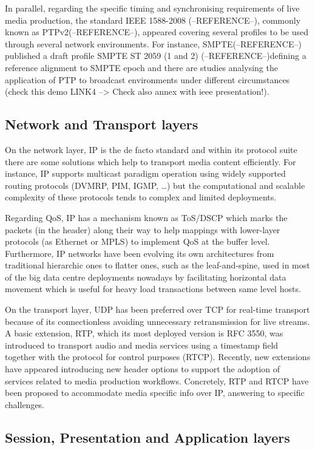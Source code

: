 In parallel, regarding the specific timing and synchronising requirements of live media production, the standard IEEE 1588-2008 (--REFERENCE--), commonly known as PTPv2(--REFERENCE--), appeared covering several profiles to be used through several network environments. For instance, SMPTE(--REFERENCE--) published a draft profile SMPTE ST 2059 (1 and 2) (--REFERENCE--)defining a reference alignment to SMPTE epoch and there are studies analysing the application of PTP to broadcast environments under different circumstances (check this demo LINK4 --> Check also annex with ieee presentation!).

\subsection{Network and Transport layers}

On the network layer, IP is the de facto standard and within its protocol suite there are some solutions which help to transport media content efficiently. For instance, IP supports multicast paradigm operation using widely supported routing protocols (DVMRP, PIM, IGMP, \ldots) but the
computational and scalable complexity of these protocols tends to complex and limited deployments.

Regarding QoS, IP has a mechanism known as ToS/DSCP which marks the packets (in the header) along their way to help mappings with lower-layer protocols (as Ethernet or MPLS) to implement QoS at the buffer level. Furthermore, IP networks have been evolving its own architectures from
traditional hierarchic ones to flatter ones, such as the leaf-and-spine, used in most of the big data centre deployments nowadays by facilitating horizontal data movement which is useful for heavy load transactions between same level hosts.

On the transport layer, UDP has been preferred over TCP for real-time transport because of its connectionless avoiding unnecessary retransmission for live streams. A basic extension, RTP, which its most
deployed version is RFC 3550, was introduced to transport audio and media services using a timestamp field together with the protocol for control purposes (RTCP). Recently, new extensions have appeared introducing new header options to support the adoption of services related to media production workflows. Concretely, RTP and RTCP have been proposed to accommodate media specific info over IP, answering to specific challenges.

\subsection{Session, Presentation and Application layers}

